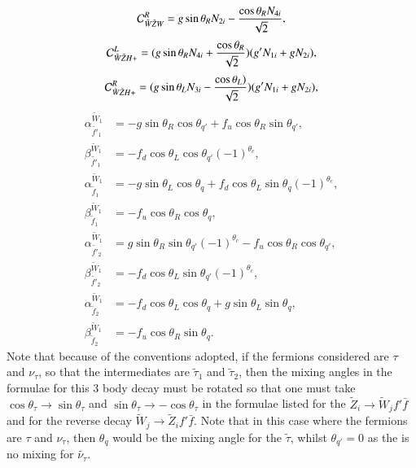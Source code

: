 \documentclass[final,3p,times,pdflatex]{elsarticle}
\begin{document}
\begin{equation}
\mathcal{C}_{\tilde{W} \tilde{Z} W}^R = g\sin\theta_R N_{2i} - {\cos\theta_R N_{4i} \over \sqrt{2}},
\end{equation}
\begin{equation}
\mathcal{C}_{\tilde{W} \tilde{Z} H+}^L = (g\sin\theta_R N_{4i} + {\cos\theta_R \over \sqrt{2}})(g' N_{1i} + g N_{2i}),
\end{equation}
\begin{equation}
\mathcal{C}_{\tilde{W} \tilde{Z} H+}^R = (g\sin\theta_L N_{3i} - {\cos\theta_L) \over \sqrt{2}})(g' N_{1i} + g N_{2i}),
\end{equation}
\begin{align}
\alpha_{\tilde{f'}_1}^{\tilde{W}_1} &= -g \sin\theta_R \cos\theta_{q'} + f_{u}\cos\theta_{R}\sin\theta_{q'}, \\
\beta_{\tilde{f'}_1}^{\tilde{W}_1} &= -f_{d}\cos\theta_L \cos\theta_{q'} (-1)^{\theta_c}, \\
\alpha_{\tilde{f}_1}^{\tilde{W}_1} &= -g\sin\theta_L \cos\theta_q + f_{d}\cos\theta_L \sin\theta_q(-1)^{\theta_c}, \\
\beta_{\tilde{f}_1}^{\tilde{W}_1} &= -f_{u}\cos\theta_R \cos\theta_q, \\
\alpha_{\tilde{f'}_2}^{\tilde{W}_1} &= g\sin\theta_R \sin\theta_{q'}(-1)^{\theta_c} - f_{u}\cos\theta_R \cos\theta_{q'}, \\
\beta_{\tilde{f'}_2}^{\tilde{W}_1} &= -f_{d}\cos\theta_L \sin\theta_{q'}(-1)^{\theta_c}, \\
\alpha_{\tilde{f}_2}^{\tilde{W}_1} &= -f_{d}\cos\theta_{L}\cos\theta_{q} + g\sin\theta_{L}\sin\theta_{q}, \\
\beta_{\tilde{f}_2}^{\tilde{W}_1} &= -f_{u}\cos\theta_R\sin\theta_{q}.
\end{align}
Note that because of the conventions adopted, if the fermions considered are $\tau$ and $\nu_{\tau}$, so that the intermediates are $\tilde{\tau}_1$ and $\tilde{\tau}_2$, then the mixing angles in the formulae for this 3 body	 decay must be rotated so that one must take $\cos\theta_{\tau} \rightarrow \sin\theta_{\tau}$ and $\sin\theta_{\tau} \rightarrow -\cos\theta_{\tau}$ in the formulae listed for the $\tilde{Z}_i \rightarrow \tilde{W}_j  f' \bar{f}$ and for the reverse decay $\tilde{W}_j \rightarrow \tilde{Z}_i  f' \bar{f}$. Note that in this case where the fermions are $\tau$ and $\nu_{\tau}$, then $\theta_q$ would be the mixing angle for the $\tilde{\tau}$, whilst $\theta_{q'} = 0$ as the is no mixing for $\tilde{\nu_{\tau}}$.
\end{document}
